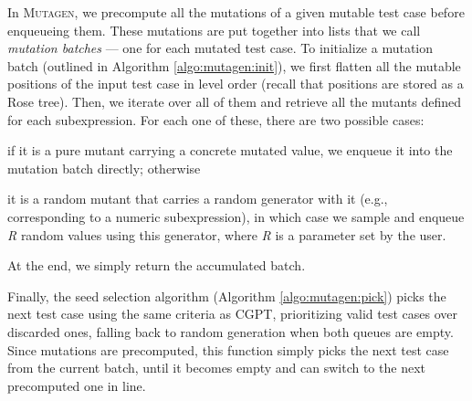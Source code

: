\documentclass[sigconf, anonymous, review]{acmart}
\newcommand{\mutagen}{\textsc{Mutagen}\xspace}
\begin{document}
In \mutagen, we precompute all the mutations of a given mutable test case before
enqueueing them.
%
These mutations are put together into lists that we call \emph{mutation batches}
--- one for each mutated test case.
%
To initialize a mutation batch (outlined in Algorithm \ref{algo:mutagen:init}),
we first flatten all the mutable positions of the input test case in level order
(recall that positions are stored as a Rose tree).
%
Then, we iterate over all of them and retrieve all the mutants defined for each
subexpression.
%
For each one of these, there are two possible cases:
%
\begin{inparaenum}
\item if it is a pure mutant carrying a concrete mutated value, we enqueue it
  into the mutation batch directly; otherwise
\item it is a random mutant that carries a random generator with it (e.g.,
  corresponding to a numeric subexpression), in which case we sample and enqueue
  \textit{R} random values using this generator, where \textit{R} is a parameter
  set by the user.
\end{inparaenum}
%
At the end, we simply return the accumulated batch.

\begin{algorithm}[b]
  \SetAlgoLined
  \DontPrintSemicolon
\caption{\label{algo:mutagen:pick}\mutagen Seed Selection}
\end{algorithm}


Finally, the seed selection algorithm (Algorithm \ref{algo:mutagen:pick}) picks
the next test case using the same criteria as CGPT, prioritizing valid test
cases over discarded ones, falling back to random generation when both queues
are empty.
%
Since mutations are precomputed, this function simply picks the next test case
from the current batch, until it becomes empty and can switch to the next
precomputed one in line.
\end{document}
